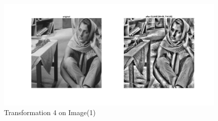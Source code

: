\documentclass[12pt, a4paper]{article}
\begin{document}
\renewcommand{\thefigure}{5.14}
\begin{figure}[H]
    \centering
    \includegraphics[width=\textwidth]{e14.jpg}
    \vspace*{-55pt}
    \caption{Transformation 4 on Image(1)}
    \label{fig:5.14}
\end{figure}
\end{document}

